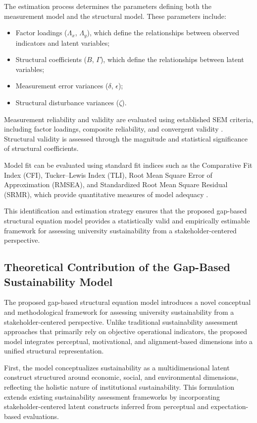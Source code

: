 \documentclass[11pt,a4paper]{article}
\begin{document}
The estimation process determines the parameters defining both the measurement model and the structural model. These parameters include:

\begin{itemize}
\item Factor loadings ($\Lambda_x$, $\Lambda_y$), which define the relationships between observed indicators and latent variables;
\item Structural coefficients ($B$, $\Gamma$), which define the relationships between latent variables;
\item Measurement error variances ($\delta$, $\epsilon$);
\item Structural disturbance variances ($\zeta$).
\end{itemize}

Measurement reliability and validity are evaluated using established SEM criteria, including factor loadings, composite reliability, and convergent validity \cite{Fornell1981,Hair2022}. Structural validity is assessed through the magnitude and statistical significance of structural coefficients.

Model fit can be evaluated using standard fit indices such as the Comparative Fit Index (CFI), Tucker–Lewis Index (TLI), Root Mean Square Error of Approximation (RMSEA), and Standardized Root Mean Square Residual (SRMR), which provide quantitative measures of model adequacy \cite{Kline2016,Byrne2016}.

This identification and estimation strategy ensures that the proposed gap-based structural equation model provides a statistically valid and empirically estimable framework for assessing university sustainability from a stakeholder-centered perspective.

\subsection{Theoretical Contribution of the Gap-Based Sustainability Model}

The proposed gap-based structural equation model introduces a novel conceptual and methodological framework for assessing university sustainability from a stakeholder-centered perspective. Unlike traditional sustainability assessment approaches that primarily rely on objective operational indicators, the proposed model integrates perceptual, motivational, and alignment-based dimensions into a unified structural representation.

First, the model conceptualizes sustainability as a multidimensional latent construct structured around economic, social, and environmental dimensions, reflecting the holistic nature of institutional sustainability. This formulation extends existing sustainability assessment frameworks by incorporating stakeholder-centered latent constructs inferred from perceptual and expectation-based evaluations.
\end{document}
